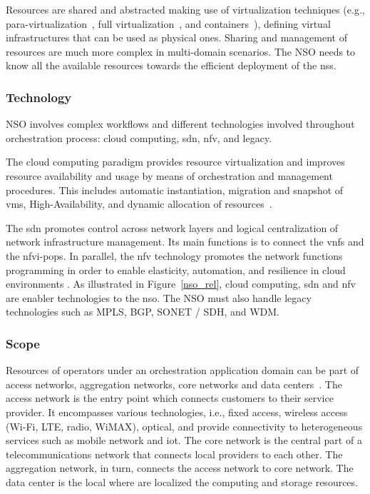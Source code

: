 Resources are shared and abstracted making use of virtualization techniques (e.g., para-virtualization~\cite{4299349}, full virtualization~\cite{4482796}, and containers~\cite{6906035}), defining virtual infrastructures that can be used as physical ones. Sharing and management of resources are much more complex in multi-domain scenarios. The NSO needs to know all the available resources towards the efficient deployment of the \glspl{ns}.  

\subsubsection{Technology}
NSO involves complex workflows and different technologies involved throughout orchestration process: cloud computing, \gls{sdn}, \gls{nfv}, and legacy.      

The cloud computing paradigm provides resource virtualization and improves resource availability and usage by means of orchestration and management procedures. This includes automatic instantiation, migration and snapshot of \glspl{vm}, High-Availability, and dynamic allocation of resources~\cite{ETSI2012NetworkAction}. 

The \gls{sdn} promotes control across network layers and logical centralization of network infrastructure management. Its main functions is to connect the \glspl{vnf} and the \gls{nfvi}-\glspl{pop}. In parallel, the \gls{nfv} technology promotes the network functions programming in order to enable elasticity, automation, and resilience in cloud environments \cite{Rotsos2017NetworkSurvey}. As illustrated in Figure~\ref{nso_rel}, cloud computing, \gls{sdn} and \gls{nfv} are enabler technologies to the \gls{nso}. The NSO must also handle legacy technologies such as MPLS, BGP, SONET / SDH, and WDM. 

\subsubsection{Scope}

Resources of operators under an orchestration application domain can be part of access networks, aggregation networks, core networks and data centers~\cite{5GPPPArchitectureWorkingGroup2016ViewArchitecture}. The access network is the entry point which connects customers to their service provider. It encompasses various technologies, i.e., fixed access, wireless access (Wi-Fi, LTE, radio, WiMAX), optical, and provide connectivity to heterogeneous services such as mobile network and \gls{iot}. The core network is the central part of a telecommunications network that connects local providers to each other. The aggregation network, in turn, connects the access network to core network. The data center is the local where are localized the computing and storage resources.


